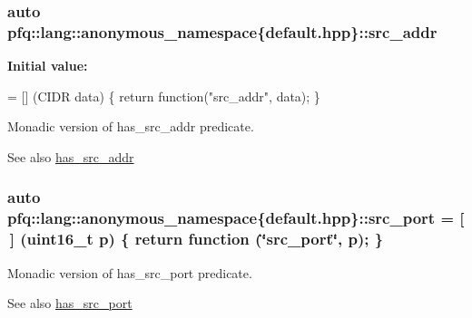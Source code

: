 \subsubsection[{\texorpdfstring{src\+\_\+addr}{src_addr}}]{\setlength{\rightskip}{0pt plus 5cm}auto pfq\+::lang\+::anonymous\+\_\+namespace\{default.\+hpp\}\+::src\+\_\+addr}\hypertarget{namespacepfq_1_1lang_1_1anonymous__namespace_02default_8hpp_03_a2ee09b5a65a64d60bc797b2ecd1c8a4a}{}\label{namespacepfq_1_1lang_1_1anonymous__namespace_02default_8hpp_03_a2ee09b5a65a64d60bc797b2ecd1c8a4a}
{\bfseries Initial value\+:}
\begin{DoxyCode}
= [] (CIDR data)
        \{
            \textcolor{keywordflow}{return} \textcolor{keyword}{function}(\textcolor{stringliteral}{"src\_addr"}, data);
        \}
\end{DoxyCode}


Monadic version of {\ttfamily has\+\_\+src\+\_\+addr} predicate. 

\begin{DoxySeeAlso}{See also}
\hyperlink{namespacepfq_1_1lang_1_1anonymous__namespace_02default_8hpp_03_acb03dd3e34d6dd7e83d621fa9077194c}{has\+\_\+src\+\_\+addr} 
\end{DoxySeeAlso}
\subsubsection[{\texorpdfstring{src\+\_\+port}{src_port}}]{\setlength{\rightskip}{0pt plus 5cm}auto pfq\+::lang\+::anonymous\+\_\+namespace\{default.\+hpp\}\+::src\+\_\+port = \mbox{[}$\,$\mbox{]} (uint16\+\_\+t p) \{ return {\bf function} (\char`\"{}src\+\_\+port\char`\"{}, p); \}}\hypertarget{namespacepfq_1_1lang_1_1anonymous__namespace_02default_8hpp_03_ad1645151270994a4f396565b70233b73}{}\label{namespacepfq_1_1lang_1_1anonymous__namespace_02default_8hpp_03_ad1645151270994a4f396565b70233b73}


Monadic version of {\ttfamily has\+\_\+src\+\_\+port} predicate. 

\begin{DoxySeeAlso}{See also}
\hyperlink{namespacepfq_1_1lang_1_1anonymous__namespace_02default_8hpp_03_a964d5ed41f50a1f3a04176f8e54d7a5a}{has\+\_\+src\+\_\+port} 
\end{DoxySeeAlso}
